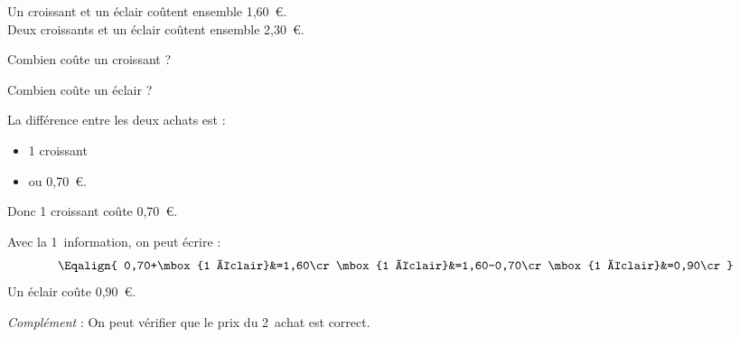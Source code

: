 Un croissant et un éclair coûtent ensemble 1,60~\textgreek{\euro}.\\Deux croissants et un éclair coûtent ensemble 2,30~\textgreek{\euro}.
\begin{myenumerate}
  \item Combien coûte un croissant ?
  \item Combien coûte un éclair ?
\end{myenumerate}
\begin{myenumerate}
\item La différence entre les deux achats est :
  \begin{itemize}
  \item 1 croissant
  \item ou 0,70~\textgreek{\euro}.
  \end{itemize}
Donc 1 croissant coûte 0,70~\textgreek{\euro}.
\item Avec la 1\iere\ information, on peut écrire :
\[\Eqalign{
0,70+\mbox{1 éclair}&=1,60\cr
\mbox{1 éclair}&=1,60-0,70\cr
\mbox{1 éclair}&=0,90\cr
}\]
Un éclair coûte 0,90~\textgreek{\euro}.
\end{myenumerate}
\par
\vspace{2mm}
{\em Complément} : On peut vérifier que le prix du 2\ieme\ achat est correct.